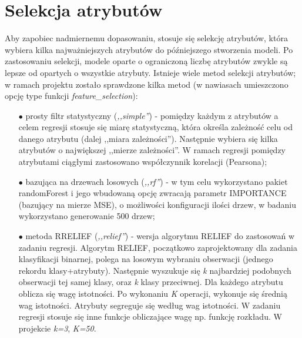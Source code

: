 \documentclass[a4paper,11pt,twoside]{mwrep}  %
\begin{document}
\clearpage

%
%
%
%



\begingroup
\let\clearpage\relax
\chapter{Selekcja atrybutów}\label{chap:selekcja}

Aby zapobiec nadmiernemu dopasowaniu, stosuje się selekcję atrybutów, która wybiera kilka najważniejszych atrybutów do późniejszego stworzenia modeli. Po zastosowaniu selekcji, modele oparte o ograniczoną liczbę atrybutów zwykle są lepsze od opartych o wszystkie atrybuty. Istnieje wiele metod selekcji atrybutów; w ramach projektu zostało sprawdzone kilka metod (w nawiasach umieszczono opcję type funkcji \textit{feature\_selection}):
\begin{itemize}
	\item[$\bullet$] prosty filtr statystyczny (\textit{,,simple''}) - pomiędzy każdym z atrybutów a celem regresji stosuje się miarę statystyczną, która określa zależność celu od danego atrybutu (dalej ,,miara zależności''). Następnie wybiera się kilka atrybutów o największej ,,mierze zależności''. W ramach regresji pomiędzy atrybutami ciągłymi zastosowano współczynnik korelacji (Pearsona);
	\item[$\bullet$] bazująca na drzewach losowych (\textit{,,rf''}) - w tym celu wykorzystano pakiet randomForest i jego wbudowaną opcję zwracają parametr IMPORTANCE (bazujący na mierze MSE), o możliwości konfiguracji ilości drzew, w badaniu wykorzystano generowanie 500 drzew;
	\item[$\bullet$] metoda RRELIEF (\textit{,,relief''}) - wersja algorytmu RELIEF do zastosowań w zadaniu regresji. Algorytm RELIEF, początkowo zaprojektowany dla zadania klasyfikacji binarnej, polega na losowym wybraniu obserwacji (jednego rekordu klasy+atrybuty). Następnie wyszukuje się \textit{k} najbardziej podobnych obserwacji tej samej klasy, oraz \textit{k} klasy przeciwnej. Dla każdego atrybutu oblicza się wagę istotności. Po wykonaniu \textit{K} operacji, wykonuje się średnią wag istotności. Atrybuty segreguje się według wag istotności. W zadaniu regresji stosuje się inne funkcje obliczające wagę np. funkcję rozkładu. W projekcie \textit{k=3}, \textit{K=50}.
\end{itemize}
	
\end{document}
